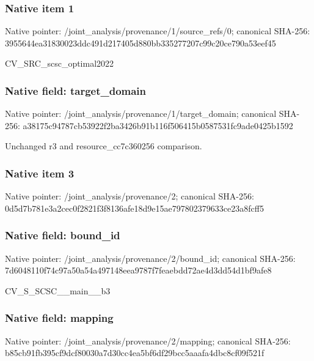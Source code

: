 \documentclass[10pt,a4paper]{article}
\begin{document}
\subsubsection{Native item 1}


Native pointer: /joint\_analysis/provenan\allowbreak{}ce/1/source\_refs/0; canonical SHA-256: 3955644ea31830023ddc491d\allowbreak{}217405d880bb335277207c99\allowbreak{}c20ce790a53eef45


CV\_SRC\_scsc\_optimal2022


\subsubsection{Native field: target\_domain}


Native pointer: /joint\_analysis/provenan\allowbreak{}ce/1/target\_domain; canonical SHA-256: a38175c94787cb53922f2ba3\allowbreak{}426b91b116f506415b058753\allowbreak{}1fc9ade0425b1592


Unchanged r3 and resource\_cc7c360256 comparison.


\subsubsection{Native item 3}


Native pointer: /joint\_analysis/provenance/2; canonical SHA-256: 0d5d7b781e3a2cec0f2821f3\allowbreak{}f8136afe18d9e15ae7978023\allowbreak{}79633ce23a8fcff5



\subsubsection{Native field: bound\_id}


Native pointer: /joint\_analysis/provenance/2/bound\_id; canonical SHA-256: 7d6048110f74c97a50a54a49\allowbreak{}7148eea9787f7feaebdd72ae\allowbreak{}4d3dd54d1bf9afe8


CV\_S\_SCSC\_\_main\_\_b3


\subsubsection{Native field: mapping}


Native pointer: /joint\_analysis/provenance/2/mapping; canonical SHA-256: b85cb91fb395cf9dcf80030a\allowbreak{}7d30cc4ea5bf6df29bcc5aaa\allowbreak{}fa4dbc8cf09f521f
\end{document}
